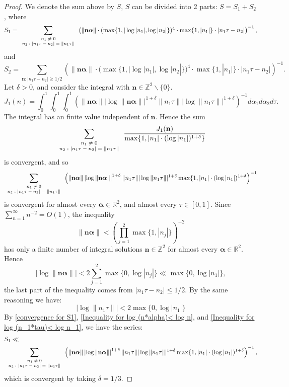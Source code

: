\documentclass[11pt]{article}
\newcommand{\beq}{\begin{equation}}
\newcommand{\eeq}{\end{equation}}
\newcommand{\fc}{\frac}
\renewcommand{\l}{\left}
\renewcommand{\r}{\right}
\newcommand{\Z}{\mathbb{Z}}
\newcommand{\R}{\mathbb{R}}
\renewcommand{\a}{\alpha}
\renewcommand{\(}{\left(}
\renewcommand{\)}{\right)}
\renewcommand{\bf}{\mathbf}
\newcommand{\ba}{\begin{array}}
\newcommand{\ea}{\end{array}}
\renewcommand{\d}{\delta}
\newcommand{\bal}{\begin{aligned}}
\newcommand{\eal}{\end{aligned}}
\newcommand{\n}{\bf{n}}
\newcommand{\bma}{\bm{\alpha}}
\newcommand{\<}{\langle}
\renewcommand{\>}{\rangle}
\begin{document}
\begin{proof}
We denote the sum above by $S$, $S$ can be divided into 2 parts: $S=S_1+S_2$, where
$$
S_1=\sum_{\mbox{\scriptsize $\ba{c} n_1\neq 0\\ n_2: |n_1\tau-n_2| =\|n_1\tau\| \ea$}} \l(\|\n\bma\|\cdot (\max\{1,|\log |n_1|,\log |n_2|\})^{4} \cdot \max\{1,|n_1|\}\cdot |n_1\tau-n_2|\r)^{-1},
$$
and 
$$
S_2=\sum_{\n: |n_1\tau-n_2|\ge 1/2} \l(\|\n\bma\|\cdot (\max\{1,|\log |n_1|,\log |n_2|\})^{4} \cdot \max\{1,|n_1|\}\cdot |n_1\tau-n_2|\r)^{-1}.
$$
Let $\d>0$, and consider the integral with $\n\in\Z^2\backslash\{0\}$.
$$
J_1(n)=\int_0^1\int_0^1\int_0^1 \l(\|\n\bma\|\l|\log \|\n\bma\|\r|^{1+\d} \|n_1\tau\| |\log \|n_1\tau\||^{1+\d}\r)^{-1} d\a_1d\a_2 d\tau.
$$
The integral has an finite value independent of $\n$. 
Hence the sum 
$$
\sum_{\mbox{\scriptsize $\ba{c} n_1\neq 0\\ n_2: |n_1\tau-n_2| =\|n_1\tau\| \ea$}} \fc{J_1(\n)}{\max\{1,|n_1|\cdot (\log |n_1|)^{1+\d}\}}
$$
is convergent, and so 
\beq\label{convergence for S1}
\sum_{\mbox{\scriptsize $\ba{c} n_1\neq 0\\ n_2: |n_1\tau-n_2| =\|n_1\tau\| \ea$}} \l(\|\n\bma\|\l|\log \|\n\bma\|\r|^{1+\d} \|n_1\tau\| |\log \|n_1\tau\||^{1+\d}\max\{1,|n_1|\cdot (\log |n_1|)^{1+\d}\r)^{-1}
\eeq
is convergent for almost every $\bma\in \R^2$, and almost every $\tau\in[0,1]$. 
Since $\sum_{n=1}^{\infty} n^{-2}=O(1)$, the inequality 
$$
\|\n \bma \|<\l(\prod_{j=1}^{2} \max\{1,|n_j|\}\r)^{-2}
$$
has only a finite number of integral solutions $\n\in\Z^2$ for almost every $\bma\in\R^2$.
Hence 
\beq\label{Inequality for log (n*alpha)< log n}
|\log \|\n\bma\||< 2\sum_{j=1}^2 \max\{0,\log |n_j|\}\ll \max\{0,\log |n_1|\},
\eeq
the last part of the inequality comes from $|n_1\tau-n_2|\le 1/2$. 
By the same reasoning we have:
\beq\label{Inequality for log (n_1*tau)< log n_1}
|\log \|n_1\tau\||< 2 \max\{0,\log |n_1|\}
\eeq
By \eqref{convergence for S1}, \eqref{Inequality for log (n*alpha)< log n}, and \eqref{Inequality for log (n_1*tau)< log n_1}, we have the series:
$$
\bal
&S_1 \ll \\ 
& \sum_{\mbox{\scriptsize $\ba{c} n_1\neq 0\\ n_2: |n_1\tau-n_2| =\|n_1\tau\| \ea$}} \l(\|\n\bma\|\l|\log \|\n\bma\|\r|^{1+\d} \|n_1\tau\| |\log \|n_1\tau\||^{1+\d}\max\{1,|n_1|\cdot (\log |n_1|)^{1+\d}\r)^{-1},\\
\eal$$
which is convergent by taking $\d=1/3$.


\end{proof}
\end{document}
